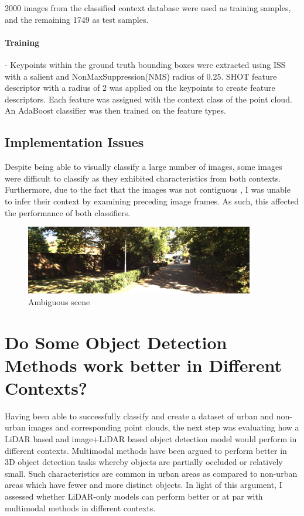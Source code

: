 2000 images from the classified context database were used as training samples, and the remaining 1749 as test samples.
\paragraph{Training} - Keypoints within the ground truth bounding boxes were extracted using  ISS with a salient and NonMaxSuppression(NMS) radius of 0.25. SHOT feature descriptor with a radius of 2 was applied on the keypoints to create feature descriptors. Each feature was assigned with the context class of the point cloud. An AdaBoost classifier was then trained on the feature types. 
\subsection{Implementation Issues} 

Despite being able to visually classify a large number of images, some images were difficult to classify as they exhibited characteristics from both contexts. Furthermore, due to the fact that the images was not contiguous , I was unable to infer their context by examining preceding image frames. As such, this affected the performance of both classifiers. 
\begin{figure}[H]%
	\centering
	\includegraphics[width=10cm]{images/ambiguous.png}%
	\caption{Ambiguous scene}%
	\label{fig:ambiguous}%
\end{figure}

\section{ Do Some Object Detection Methods work better in Different Contexts?}

Having been able to successfully classify and create a dataset of urban and non-urban images and corresponding point clouds, the next step was evaluating how a LiDAR based and image+LiDAR based object detection model would perform in different contexts. Multimodal methods have been argued to perform better in 3D object detection tasks whereby objects are partially occluded or relatively small. Such characteristics are common in urban areas as compared to non-urban areas which have fewer and more distinct objects. In light of this argument, I assessed whether LiDAR-only models can perform better or at par with multimodal methods in different contexts. 

